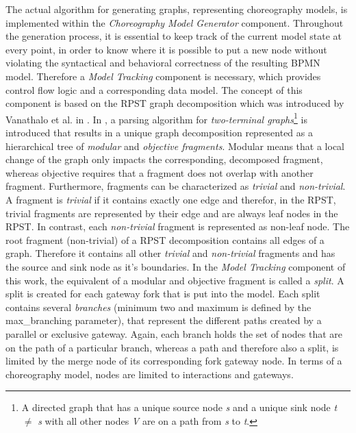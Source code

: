 The actual algorithm for generating graphs, representing choreography models, is implemented within the \textit{Choreography Model Generator} component. Throughout the generation process, it is essential to keep track of the current model state at every point, in order to know where it is possible to put a new node without violating the syntactical and behavioral correctness of the resulting BPMN model. Therefore a \textit{Model Tracking} component is necessary, which provides control flow logic and a corresponding data model. The concept of this component is based on the RPST graph decomposition which was introduced by Vanathalo et al. in \cite{rpst}. In \cite{rpst}, a parsing algorithm for \textit{two-terminal graphs}\footnote{A directed graph that has a unique source node \textit{s} and a unique sink node \textit{t} $\neq$ \textit{s} with all other nodes \textit{V} are on a path from \textit{s} to \textit{t}.} is introduced that results in a unique graph decomposition represented as a hierarchical tree of \textit{modular} and \textit{objective fragments}. Modular means that a local change of the graph only impacts the corresponding, decomposed fragment, whereas objective requires that a fragment does not overlap with another fragment. Furthermore, fragments can be characterized as \textit{trivial} and \textit{non-trivial}. A fragment is \textit{trivial} if it contains exactly one edge and therefor, in the RPST, trivial fragments are represented by their edge and are always leaf nodes in the RPST. In contrast, each \textit{non-trivial} fragment is represented as non-leaf node. The root fragment (non-trivial) of a RPST decomposition contains all edges of a graph. Therefore it contains all other \textit{trivial} and \textit{non-trivial} fragments and has the source and sink node as it's boundaries. In the \textit{Model Tracking} component of this work, the equivalent of a modular and objective fragment is called a \textit{split}. A split is created for each gateway fork that is put into the model. Each split contains several \textit{branches} (minimum two and maximum is defined by the max\_branching parameter), that represent the different paths created by a parallel or exclusive gateway. Again, each branch holds the set of nodes that are on the path of a particular branch, whereas a path and therefore also a split, is limited by the merge node of its corresponding fork gateway node. In terms of a choreography model, nodes are limited to interactions and gateways. 

